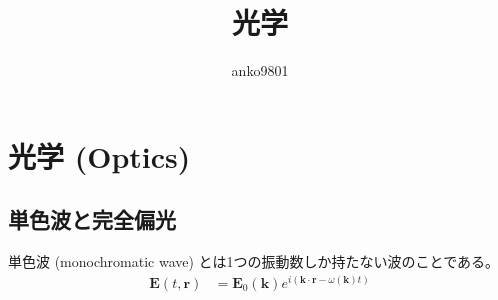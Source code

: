 \documentclass[uplatex,dvipdfmx,a4paper,11pt]{jlreq}
\title{光学}
\author{anko9801}
\newcommand{\EE}{\bm{E}}
\newcommand{\rr}{\bm{r}}
\newcommand{\kk}{\bm{k}}
\theoremstyle{definition}
\begin{document}
\maketitle
\tableofcontents
\clearpage

\section{光学 (Optics)}
\subsection{単色波と完全偏光}
\begin{definition}[単色波]
  単色波 (monochromatic wave) とは1つの振動数しか持たない波のことである。
  \begin{align}
    \EE(t, \rr) & = \EE_0(\kk)e^{i(\kk\cdot\rr - \omega(\kk)t)}
  \end{align}
\end{definition}
\end{document}
